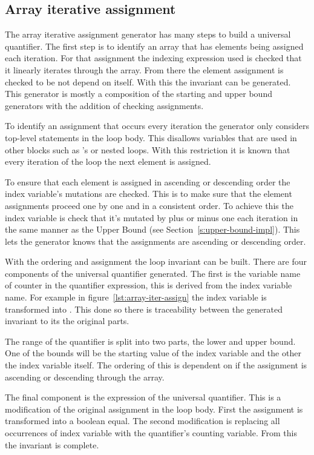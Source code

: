 \subsection{Array iterative assignment}

The array iterative assignment generator has many steps to build
a universal quantifier.
The first step is to identify an array that has elements being assigned each iteration.
For that assignment the indexing expression used is checked that it linearly
iterates through the array.
From there the element assignment is checked to be not depend on itself.
With this the invariant can be generated.
This generator is mostly a composition of the starting and upper bound generators with
the addition of checking assignments.

To identify an assignment that occurs every iteration the generator
only considers top-level statements in the loop body.
This disallows variables that are used in other blocks such as
's or nested loops.
With this restriction it is known that every iteration of the loop 
the next element is assigned.

To ensure that each element is assigned in ascending or descending order the index variable's mutations
are checked.
This is to make sure that the element assignments proceed one by one and in a consistent order.
To achieve this the index variable is check that it's mutated by plus or minus one each
iteration in the same manner as the Upper Bound (see Section~\ref{s:upper-bound-impl}).
This lets the generator knows that the assignments are ascending or descending order.

With the ordering and assignment the loop invariant can be built.
There are four components of the universal quantifier generated.
The first is the variable name of counter in the quantifier expression,
this is derived from the index variable name.
For example in figure~\ref{lst:array-iter-assign} the index
variable  is transformed into .
This done so there is traceability between the generated invariant to
its the original parts.

The range of the quantifier is split into two parts, the lower and upper
bound. One of the bounds will be the starting value of the index variable
and the other the index variable itself.
The ordering of this is dependent on if the assignment is ascending or 
descending through the array.

The final component is the expression of the universal quantifier.
This is a modification of the original assignment in the loop body.
First the assignment is transformed into a boolean equal.
The second modification is replacing all occurrences of index variable
with the quantifier's counting variable.
From this the invariant is complete.  

